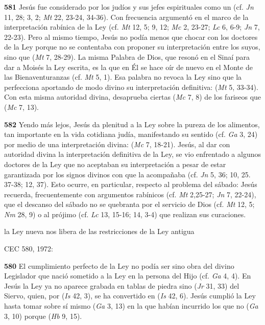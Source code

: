 \textbf{581} Jesús fue considerado por los judíos y sus jefes espirituales como un  (cf. \emph{Jn} 11, 28; 3, 2; \emph{Mt} 22, 23-24, 34-36). Con frecuencia argumentó en el marco de la interpretación rabínica de la Ley (cf. \emph{Mt} 12, 5; 9, 12; \emph{Mc} 2, 23-27; \emph{Lc} 6, 6-9; \emph{Jn} 7, 22-23). Pero al mismo tiempo, Jesús no podía menos que chocar con los doctores de la Ley porque no se contentaba con proponer su interpretación entre los suyos, sino que  (\emph{Mt} 7, 28-29). La misma Palabra de Dios, que resonó en el Sinaí para dar a Moisés la Ley escrita, es la que en Él se hace oír de nuevo en el Monte de las Bienaventuranzas (cf. \emph{Mt} 5, 1). Esa palabra no revoca la Ley sino que la perfecciona aportando de modo divino su interpretación definitiva:  (\emph{Mt} 5, 33-34). Con esta misma autoridad divina, desaprueba ciertas  (\emph{Mc} 7, 8) de los fariseos que  (\emph{Mc} 7, 13).

\textbf{582} Yendo más lejos, Jesús da plenitud a la Ley sobre la pureza de los alimentos, tan importante en la vida cotidiana judía, manifestando su sentido  (cf. \emph{Ga} 3, 24) por medio de una interpretación divina:  (\emph{Mc} 7, 18-21). Jesús, al dar con autoridad divina la interpretación definitiva de la Ley, se vio enfrentado a algunos doctores de la Ley que no aceptaban su interpretación a pesar de estar garantizada por los signos divinos con que la acompañaba (cf. \emph{Jn} 5, 36; 10, 25. 37-38; 12, 37). Esto ocurre, en particular, respecto al problema del sábado: Jesús recuerda, frecuentemente con argumentos rabínicos (cf. \emph{Mt} 2,25-27; \emph{Jn} 7, 22-24), que el descanso del sábado no se quebranta por el servicio de Dios (cf. \emph{Mt} 12, 5; \emph{Nm} 28, 9) o al prójimo (cf. \emph{Lc} 13, 15-16; 14, 3-4) que realizan sus curaciones.

la Ley nueva nos libera de las restricciones de la Ley antigua

CEC 580, 1972:

\textbf{580} El cumplimiento perfecto de la Ley no podía ser sino obra del divino Legislador que nació sometido a la Ley en la persona del Hijo (cf. \emph{Ga} 4, 4). En Jesús la Ley ya no aparece grabada en tablas de piedra sino  (\emph{Jr} 31, 33) del Siervo, quien, por  (\emph{Is} 42, 3), se ha convertido en  (\emph{Is} 42, 6). Jesús cumplió la Ley hasta tomar sobre sí mismo  (\emph{Ga} 3, 13) en la que habían incurrido los que no  (\emph{Ga} 3, 10) porque  (\emph{Hb} 9, 15).

